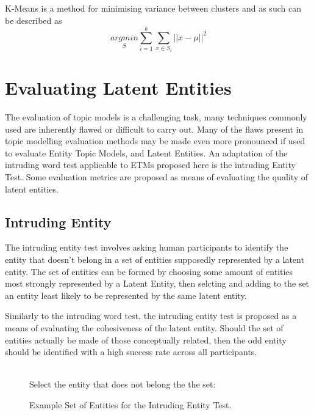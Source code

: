 \documentclass[10pt]{report}
\begin{document}
K-Means is a method for minimising variance between clusters and as such can be described as
\[
  \underset{S}{argmin} \sum^{k}_{i=1}\sum^{}_{x\in S_i}||x-\mu||^2
\]

\section{Evaluating Latent Entities}
The evaluation of topic models is a challenging task, many techniques commonly used are inherently flawed or difficult to carry out. Many of the flaws present in topic modelling evaluation methods may be made even more pronounced if used to evaluate Entity Topic Models, and Latent Entities. An adaptation of the intruding word test applicable to ETMs proposed here is the intruding Entity Test. Some evaluation metrics are proposed as means of evaluating the quality of latent entities.

\subsection{Intruding Entity}
The intruding entity test involves asking human participants to identify the entity that doesn't belong in a set of entities supposedly represented by a latent entity. The set of entities can be formed by choosing some amount of entities most strongly represented by a Latent Entity, then selcting and adding to the set an entity least likely to be represented by the same latent entity.

Similarly to the intruding word test, the intruding entity test is proposed as a means of evaluating the cohesiveness of the latent entity. Should the set of entities actually be made of those conceptually related, then the odd entity should be identified with a high success rate across all participants.

\begin{figure}[h!]
  \centering
  \\
Select the entity that does not belong the the set: \underline{\quad \quad \quad \quad \quad \quad}
  \caption{Example Set of Entities for the Intruding Entity Test.\label{fig:intruding_entity}}
\end{figure}
\end{document}
